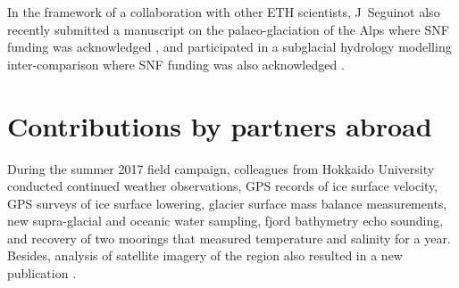 \documentclass{article}
\begin{document}
    In the framework of a collaboration with other ETH scientists, J~Seguinot
    also recently submitted a manuscript on the palaeo-glaciation of the Alps
    where SNF funding was acknowledged \citep{Seguinot.etal.2018}, and
    participated in a subglacial hydrology modelling inter-comparison where SNF
    funding was also acknowledged \citep{Fleurian.etal.submitted}.


\section{Contributions by partners abroad}

    During the summer 2017 field campaign, colleagues from Hokkaido University
    conducted continued weather observations, GPS records of ice surface
    velocity, GPS surveys of ice surface lowering, glacier surface mass balance
    measurements, new supra-glacial and oceanic water sampling, fjord
    bathymetry echo sounding, and recovery of two moorings that measured
    temperature and salinity for a year. Besides, analysis of satellite imagery
    of the region also resulted in a new publication
    \citep{Sakakibara.Sugiyama.2018}.





\small



\end{document}
